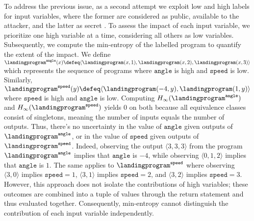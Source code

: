 To address the previous issue, as a second attempt we exploit low and high labels for input variables, where the former are considered as public, available to the attacker, and the latter as secret .
To assess the impact of each input variable, we prioritize one high variable at a time, considering all others as low variables.
Subsequently, we compute the min-entropy of the labelled program to quantify the extent of the impact.
We define $\landingprogram^{\texttt{angle}}(x)\defeq \langle\landingprogram(x, 1), \landingprogram(x, 2), \landingprogram(x, 3)\rangle$ which represents the sequence of programs where ${\texttt{angle}}$ is high and ${\texttt{speed}}$ is low.
Similarly, $\landingprogram^{\texttt{speed}}(y)\defeq\langle\landingprogram(-4, y), \landingprogram(1, y)\rangle$ where ${\texttt{speed}}$ is high and ${\texttt{angle}}$ is low.
Computing $\minentropy(\landingprogram^{\texttt{angle}})$ and $\minentropy(\landingprogram^{\texttt{speed}})$ yields 0 on both because all equivalence classes consist of singletons, meaning the number of inputs equals the number of outputs. Thus, there's no uncertainty in the value of ${\texttt{angle}}$ given outputs of $\landingprogram^{\texttt{angle}}$, or in the value of ${\texttt{speed}}$ given outputs of $\landingprogram^{\texttt{speed}}$.
Indeed, observing the output $\langle 3, 3, 3\rangle$ from the program $\landingprogram^{\texttt{angle}}$ implies that ${\texttt{angle}}$ is $-4$, while observing $\langle 0, 1, 2 \rangle$ implies that ${\texttt{angle}}$ is $1$. The same applies to $\landingprogram^{\texttt{speed}}$ where observing $\langle 3, 0 \rangle$ implies ${\texttt{speed}}=1$, $\langle 3, 1\rangle$ implies ${\texttt{speed}}=2$, and $\langle 3, 2\rangle$ implies ${\texttt{speed}}=3$.
However, this approach does not isolate the contributions of high variables; these outcomes are combined into a tuple of values through the return statement and thus evaluated together. Consequently, min-entropy cannot distinguish the contribution of each input variable independently.

